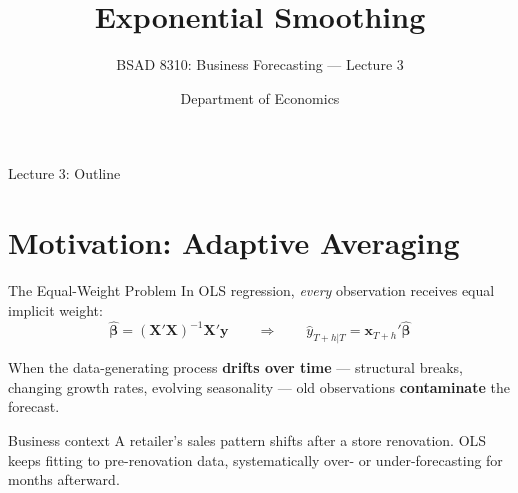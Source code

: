 \documentclass[aspectratio=169, 11pt]{beamer}
\title{Exponential Smoothing}
\subtitle{BSAD 8310: Business Forecasting --- Lecture 3}
\author{Department of Economics}
\institute{University of Nebraska at Omaha}
\begin{document}

\begin{frame}
  \titlepage
\end{frame}

\begin{frame}{Lecture 3: Outline}
  \tableofcontents
\end{frame}

\section{Motivation: Adaptive Averaging}


\begin{frame}{The Equal-Weight Problem}
  In OLS regression, \emph{every} observation receives equal implicit weight:
  \[
    \hat{\boldsymbol{\beta}} = (\mathbf{X}'\mathbf{X})^{-1}\mathbf{X}'\mathbf{y}
    \qquad \Rightarrow \qquad
    \hat{y}_{T+h|T} = \mathbf{x}_{T+h}'\hat{\boldsymbol{\beta}}
  \]
  \begin{warningbox}
    When the data-generating process \textbf{drifts over time} --- structural
    breaks, changing growth rates, evolving seasonality --- old observations
    \textbf{contaminate} the forecast.
  \end{warningbox}
  \begin{examplebox}{Business context}
    A retailer's sales pattern shifts after a store renovation.
    OLS keeps fitting to pre-renovation data, systematically over- or
    under-forecasting for months afterward.
  \end{examplebox}
\end{frame}
\end{document}

